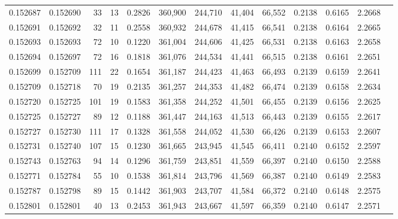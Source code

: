 \begin{tabular}{rrrrrrrrrrrrr}
0.152687 & 0.152690 &    33 &  13 &                                     0.2826 & 360,900 & 244,710 &  41,404 &  66,552 & 0.2138 & 0.6165 & 2.2668 \\
0.152691 & 0.152692 &    32 &  11 &                                     0.2558 & 360,932 & 244,678 &  41,415 &  66,541 & 0.2138 & 0.6164 & 2.2665 \\
0.152693 & 0.152693 &    72 &  10 &                                     0.1220 & 361,004 & 244,606 &  41,425 &  66,531 & 0.2138 & 0.6163 & 2.2658 \\
0.152694 & 0.152697 &    72 &  16 &                                     0.1818 & 361,076 & 244,534 &  41,441 &  66,515 & 0.2138 & 0.6161 & 2.2651 \\
0.152699 & 0.152709 &   111 &  22 &                                     0.1654 & 361,187 & 244,423 &  41,463 &  66,493 & 0.2139 & 0.6159 & 2.2641 \\
0.152709 & 0.152718 &    70 &  19 &                                     0.2135 & 361,257 & 244,353 &  41,482 &  66,474 & 0.2139 & 0.6158 & 2.2634 \\
0.152720 & 0.152725 &   101 &  19 &                                     0.1583 & 361,358 & 244,252 &  41,501 &  66,455 & 0.2139 & 0.6156 & 2.2625 \\
0.152725 & 0.152727 &    89 &  12 &                                     0.1188 & 361,447 & 244,163 &  41,513 &  66,443 & 0.2139 & 0.6155 & 2.2617 \\
0.152727 & 0.152730 &   111 &  17 &                                     0.1328 & 361,558 & 244,052 &  41,530 &  66,426 & 0.2139 & 0.6153 & 2.2607 \\
0.152731 & 0.152740 &   107 &  15 &                                     0.1230 & 361,665 & 243,945 &  41,545 &  66,411 & 0.2140 & 0.6152 & 2.2597 \\
0.152743 & 0.152763 &    94 &  14 &                                     0.1296 & 361,759 & 243,851 &  41,559 &  66,397 & 0.2140 & 0.6150 & 2.2588 \\
0.152771 & 0.152784 &    55 &  10 &                                     0.1538 & 361,814 & 243,796 &  41,569 &  66,387 & 0.2140 & 0.6149 & 2.2583 \\
0.152787 & 0.152798 &    89 &  15 &                                     0.1442 & 361,903 & 243,707 &  41,584 &  66,372 & 0.2140 & 0.6148 & 2.2575 \\
0.152801 & 0.152801 &    40 &  13 &                                     0.2453 & 361,943 & 243,667 &  41,597 &  66,359 & 0.2140 & 0.6147 & 2.2571 \\

\end{tabular}
